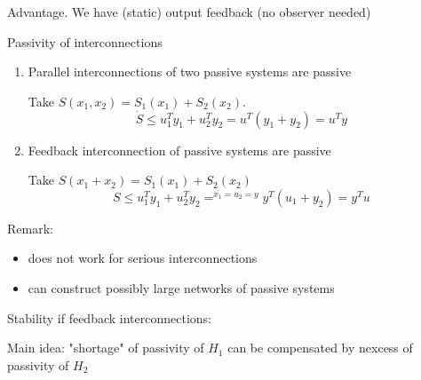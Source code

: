 Advantage. We have (static) output feedback (no observer needed)

Passivity of interconnections
\begin{enumerate}
\item Parallel interconnections of two passive systems are passive 

Take $S(x_1,x_2) = S_1(x_1) +S_2(x_2)$.
\begin{equation*}
\dot{S} \leq u_1^Ty_1 + u_2^Ty_2 = u^T(y_1+y_2) = u^Ty
\end{equation*}
\item Feedback interconnection of passive systems are passive


Take $S(x_1+x_2) = S_1(x_1) + S_2(x_2)$
\begin{equation*}
S \leq u_1^Ty_1 + u_2^Ty_2 =^{x_1=u_2=y} y^T(u_1+y_2) = y^Tu
\end{equation*}
\end{enumerate}

Remark:
\begin{itemize}
\item does not work for serious interconnections
\item can construct possibly large networks of passive systems
\end{itemize}

Stability if feedback interconnections:

Main idea: "shortage" of passivity of $H_1$ can be compensated by nexcess of passivity of $H_2$

